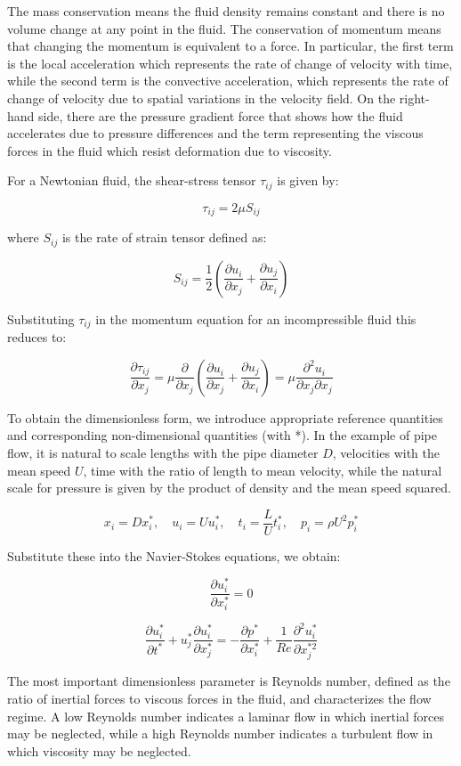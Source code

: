 \documentclass{article}
\begin{document}
The mass conservation means the fluid density remains constant and there is no volume change at any point in the fluid. The conservation of momentum means that changing the momentum is equivalent to a force. In particular, the first term is the local acceleration which represents the rate of change of velocity with time, while the second term is the convective acceleration, which represents the rate of change of velocity due to spatial variations in the velocity field. On the right-hand side, there are the pressure gradient force that shows how the fluid accelerates due to pressure differences and the term representing the viscous forces in the fluid which resist deformation due to viscosity.

For a Newtonian fluid, the shear-stress tensor $\tau_{ij}$ is given by:

\[
\tau_{ij} = 2 \mu S_{ij}
\]

where $S_{ij}$ is the rate of strain tensor defined as:

\[
S_{ij} = \frac{1}{2} \left( \frac{\partial u_i}{\partial x_j} + \frac{\partial u_j}{\partial x_i} \right)
\]

Substituting $\tau_{ij}$ in the momentum equation for an incompressible fluid this reduces to:

\[
\frac{\partial \tau_{ij}}{\partial x_j} = \mu \frac{\partial}{\partial x_j} \left( \frac{\partial u_i}{\partial x_j} + \frac{\partial u_j}{\partial x_i} \right) = \mu \frac{\partial^2 u_i}{\partial x_j \partial x_j}
\]

To obtain the dimensionless form, we introduce appropriate reference quantities and corresponding non-dimensional quantities (with *). In the example of pipe flow, it is natural to scale lengths with the pipe diameter $D$, velocities with the mean speed $U$, time with the ratio of length to mean velocity, while the natural scale for pressure is given by the product of density and the mean speed squared.

\[
x_i = D x_i^*, \quad u_i = U u_i^*, \quad t_i = \frac{L}{U} t_i^*, \quad p_i = \rho U^2 p_i^*
\]

Substitute these into the Navier-Stokes equations, we obtain:

\[
\frac{\partial u_i^*}{\partial x_i^*} = 0
\]

\[
\frac{\partial u_i^*}{\partial t^*} + u_j^* \frac{\partial u_i^*}{\partial x_j^*} = - \frac{\partial p^*}{\partial x_i^*} + \frac{1}{Re} \frac{\partial^2 u_i^*}{\partial x_j^{*2}}
\]

The most important dimensionless parameter is Reynolds number, defined as the ratio of inertial forces to viscous forces in the fluid, and characterizes the flow regime. A low Reynolds number indicates a laminar flow in which inertial forces may be neglected, while a high Reynolds number indicates a turbulent flow in which viscosity may be neglected.
\end{document}
